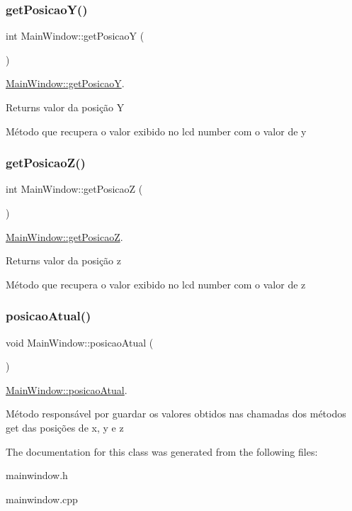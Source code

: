 \subsubsection{\texorpdfstring{getPosicaoY()}{getPosicaoY()}}
{\footnotesize\ttfamily int Main\+Window\+::get\+PosicaoY (\begin{DoxyParamCaption}{ }\end{DoxyParamCaption})}



\mbox{\hyperlink{classMainWindow_a79dd8ed86b37fd50a4f15293960adf16}{Main\+Window\+::get\+PosicaoY}}. 

\begin{DoxyReturn}{Returns}
valor da posição Y
\end{DoxyReturn}
Método que recupera o valor exibido no lcd number com o valor de y \mbox{\label{classMainWindow_a91cc6b0f1be1fae34eae724789370906}} 
\subsubsection{\texorpdfstring{getPosicaoZ()}{getPosicaoZ()}}
{\footnotesize\ttfamily int Main\+Window\+::get\+PosicaoZ (\begin{DoxyParamCaption}{ }\end{DoxyParamCaption})}



\mbox{\hyperlink{classMainWindow_a91cc6b0f1be1fae34eae724789370906}{Main\+Window\+::get\+PosicaoZ}}. 

\begin{DoxyReturn}{Returns}
valor da posição z
\end{DoxyReturn}
Método que recupera o valor exibido no lcd number com o valor de z \mbox{\label{classMainWindow_aaa69318d2e78939d276d2aff84b66fae}} 
\subsubsection{\texorpdfstring{posicaoAtual()}{posicaoAtual()}}
{\footnotesize\ttfamily void Main\+Window\+::posicao\+Atual (\begin{DoxyParamCaption}{ }\end{DoxyParamCaption})}



\mbox{\hyperlink{classMainWindow_aaa69318d2e78939d276d2aff84b66fae}{Main\+Window\+::posicao\+Atual}}. 

Método responsável por guardar os valores obtidos nas chamadas dos métodos get das posições de x, y e z 

The documentation for this class was generated from the following files\+:\begin{DoxyCompactItemize}
\item 
mainwindow.\+h\item 
mainwindow.\+cpp\end{DoxyCompactItemize}
